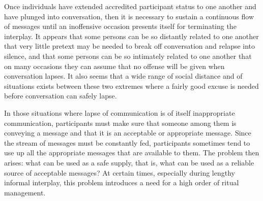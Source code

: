 \documentclass[openany,nobib]{tufte-book}
\begin{document}
\enlargethispage{\baselineskip}

Once individuals have extended accredited participant status to one
another and have plunged into conversation, then it is necessary to
sustain a continuous flow of messages until an inoffensive occasion
presents itself for terminating the interplay. It appears that some
persons can be so distantly related to one another that very little
pretext may be needed to break off conversation and relapse into
silence, and that some persons can be so intimately related to one
another that on many occasions they can assume that no offense will be
given when conversation lapses. It also seems that a wide range of
social distance and of situations exists between these two extremes
where a fairly good excuse is needed before conversation can safely
lapse.

In those situations where lapse of communication is of itself
inappropriate communication, participants must make sure that someone
among them is conveying a message and that it is an acceptable or
appropriate message. Since the stream of messages must be constantly
fed, participants sometimes tend to use up all the appropriate messages
that are available to them. The problem then arises: what can be used as
a safe supply, that is, what can be used as a reliable source of
acceptable messages? At certain times, especially during lengthy
informal interplay, this problem introduces a need for a high order of
ritual management.
\end{document}

